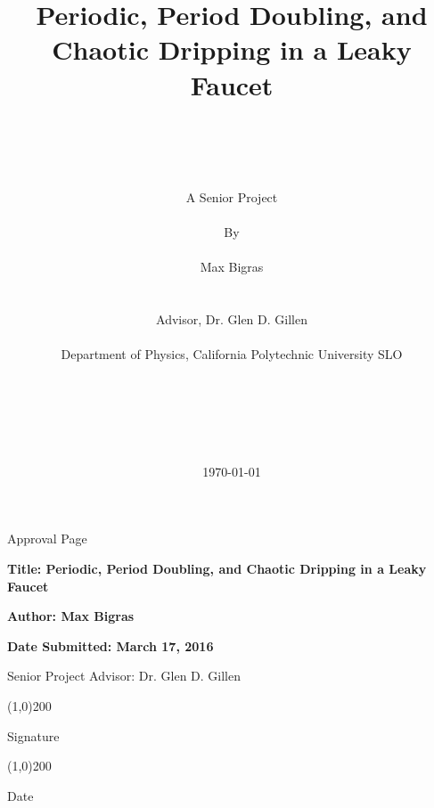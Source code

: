 \documentclass[11pt]{article}
\title{Periodic, Period Doubling, and Chaotic Dripping in a Leaky Faucet}
\author
{\\
\\
\\
\\
A Senior Project
\\
\\
By
\\
\\
Max Bigras
\\
\\
\\ 
\normalsize{Advisor, Dr. Glen D. Gillen}
\\
\\
\normalsize{Department of Physics, California Polytechnic University SLO}\\
\\
\\
\\
\\
\\
}
\date{\today}
\begin{document}
\baselineskip21pt
\maketitle


\newpage

\begin{center}Approval Page\end{center}
\bigskip

\begin{flushleft}
\textbf{Title: Periodic, Period Doubling, and Chaotic Dripping in a Leaky Faucet}
\medskip

\textbf{Author: Max Bigras}
\medskip

\textbf{Date Submitted: March 17, 2016}
\end{flushleft}

\bigskip
\bigskip
\bigskip
\bigskip
\bigskip
\bigskip
\bigskip
\bigskip
\bigskip
\bigskip
\bigskip
\bigskip
\bigskip
\bigskip
\bigskip
\bigskip
\bigskip
\bigskip
\bigskip


\begin{flushright}
Senior Project Advisor: Dr. Glen D. Gillen

\bigskip
\bigskip


\line(1,0){200}

Signature
\bigskip

\line(1,0){200}

Date



\end{flushright}




\newpage

\tableofcontents

\listoftables

\listoffigures

\newpage

\newpage

\end{document}
